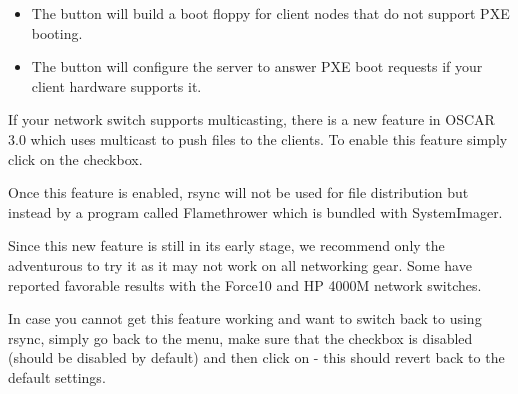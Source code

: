 \begchange
\begin{itemize}
\item The  button will build a boot floppy
   for client nodes that do not support PXE booting.
\item The  button will configure the server
   to answer PXE boot requests if your client hardware supports it.
\end{itemize}
\endchange

If your network switch supports multicasting, there is a new feature in
OSCAR 3.0 which uses multicast to push files to the clients.  To enable
this feature simply click on the  checkbox.

Once this feature is enabled, rsync will not be used for file distribution
but instead by a program called Flamethrower which is bundled with
SystemImager.

Since this new feature is still in its early stage, we recommend only the
adventurous to try it as it may not work on all networking gear.  Some
have reported favorable results with the Force10 and HP 4000M network
switches.

In case you cannot get this feature working and want to switch back
to using rsync, simply go back to the 
menu, make sure that the  checkbox is
disabled (should be disabled by default) and then click on
 - this should revert back to the
default settings.

